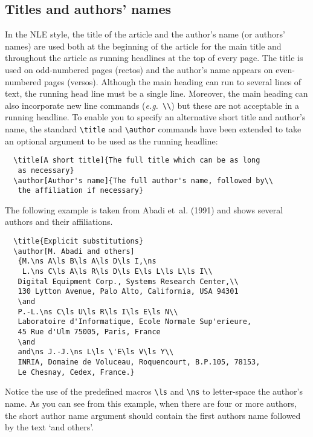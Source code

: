 \documentclass{cnle}
\newcommand\eg{{\it e.g.\ }}
\begin{document}
\subsection{Titles and authors' names}

In the NLE style, the title of the article and the author's name (or authors'
names) are used both at the beginning of the article for the main title and
throughout the article as running headlines at the top of every page.
The title is used on odd-numbered pages (rectos) and the author's name appears
on even-numbered pages (versos).
Although the main heading can run to several lines of text, the running head
line must be a single line.
Moreover, the main heading can also incorporate new line commands
(\eg \verb"\\") but these are not acceptable in a running headline.
To enable you to specify an alternative short title and author's name, the
standard \verb"\title" and \verb"\author" commands have been extended to take
an optional argument to be used as the running headline:
%
\begin{verbatim}
  \title[A short title]{The full title which can be as long
   as necessary}
  \author[Author's name]{The full author's name, followed by\\
   the affiliation if necessary}
\end{verbatim}
%
The following example is taken from Abadi et~al. (1991) and
shows several authors and their affiliations.
%
\begin{verbatim}
  \title{Explicit substitutions}
  \author[M. Abadi and others]
   {M.\ns A\ls B\ls A\ls D\ls I,\ns
    L.\ns C\ls A\ls R\ls D\ls E\ls L\ls L\ls I\\
   Digital Equipment Corp., Systems Research Center,\\
   130 Lytton Avenue, Palo Alto, California, USA 94301
   \and
   P.-L.\ns C\ls U\ls R\ls I\ls E\ls N\\
   Laboratoire d'Informatique, Ecole Normale Sup'erieure,
   45 Rue d'Ulm 75005, Paris, France
   \and
   and\ns J.-J.\ns L\ls \'E\ls V\ls Y\\
   INRIA, Domaine de Voluceau, Roquencourt, B.P.105, 78153,
   Le Chesnay, Cedex, France.}
\end{verbatim}
Notice the use of the predefined macros \verb"\ls" and \verb"\ns" to
letter-space the author's name. As you can see from this example, when
there are four or more authors, the short author name argument should
contain the first authors name followed by the text `and others'.
\end{document}
